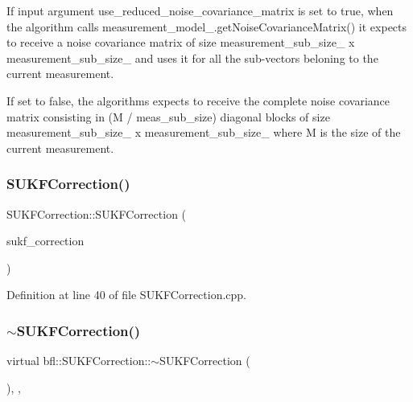 If input argument use\+\_\+reduced\+\_\+noise\+\_\+covariance\+\_\+matrix is set to true, when the algorithm calls measurement\+\_\+model\+\_\+.\+get\+Noise\+Covariance\+Matrix() it expects to receive a noise covariance matrix of size measurement\+\_\+sub\+\_\+size\+\_\+ x measurement\+\_\+sub\+\_\+size\+\_\+ and uses it for all the sub-\/vectors beloning to the current measurement. 

If set to false, the algorithms expects to receive the complete noise covariance matrix consisting in (M / meas\+\_\+sub\+\_\+size) diagonal blocks of size measurement\+\_\+sub\+\_\+size\+\_\+ x measurement\+\_\+sub\+\_\+size\+\_\+ where M is the size of the current measurement. \mbox{\label{classbfl_1_1SUKFCorrection_a74f7500ab29ca256f83993e838047735}} 
\subsubsection{\texorpdfstring{S\+U\+K\+F\+Correction()}{SUKFCorrection()}\hspace{0.1cm}{\footnotesize\ttfamily [3/3]}}
{\footnotesize\ttfamily S\+U\+K\+F\+Correction\+::\+S\+U\+K\+F\+Correction (\begin{DoxyParamCaption}\item[{\mbox{\hyperlink{classbfl_1_1SUKFCorrection}{S\+U\+K\+F\+Correction}} \&\&}]{sukf\+\_\+correction }\end{DoxyParamCaption})\hspace{0.3cm}{\ttfamily [noexcept]}}



Definition at line 40 of file S\+U\+K\+F\+Correction.\+cpp.

\mbox{\label{classbfl_1_1SUKFCorrection_acadbfb1ba75c7e1c90c0a480aa1cb0fd}} 
\subsubsection{\texorpdfstring{$\sim$\+S\+U\+K\+F\+Correction()}{~SUKFCorrection()}}
{\footnotesize\ttfamily virtual bfl\+::\+S\+U\+K\+F\+Correction\+::$\sim$\+S\+U\+K\+F\+Correction (\begin{DoxyParamCaption}{ }\end{DoxyParamCaption})\hspace{0.3cm}{\ttfamily [inline]}, {\ttfamily [virtual]}, {\ttfamily [noexcept]}}



